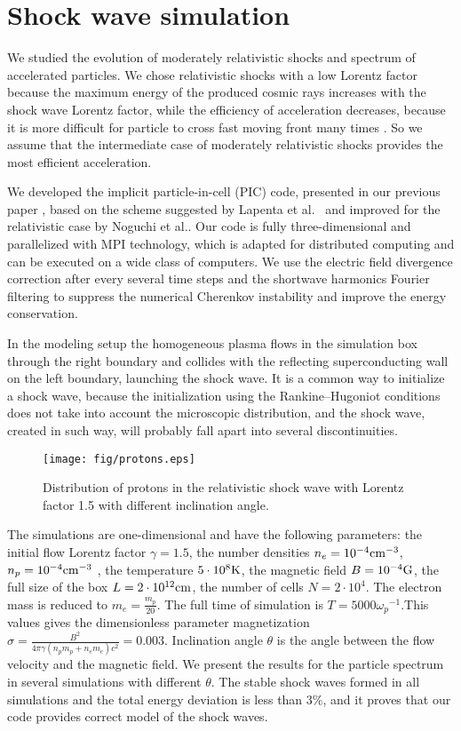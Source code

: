 \section{Shock wave simulation}
We studied the evolution of moderately relativistic shocks and spectrum of accelerated particles. We chose relativistic shocks with a low Lorentz factor because the maximum energy of the produced cosmic rays increases with the shock wave Lorentz factor, while the efficiency of acceleration decreases, 
because it is more difficult for particle to cross fast moving front many times 
%
\cite{Ellison2013}. So we assume that the intermediate case of moderately relativistic shocks provides the most efficient acceleration.

We developed the implicit particle-in-cell (PIC) code, presented in our previous paper \cite{Romansky2016}, based on the scheme suggested by Lapenta et al.~\cite{Lapenta2006} and improved for the relativistic case by Noguchi et al.\cite{Noguchi2007}.
Our code is fully three-dimensional and parallelized with MPI technology, which is adapted for distributed computing and can be executed on a wide class of computers. We use 
the electric field divergence correction
after every several time steps and 
the shortwave harmonics Fourier filtering
to suppress the numerical Cherenkov instability and improve the energy conservation.

In the modeling setup the homogeneous plasma flows in the simulation box through the right boundary
and collides with the reflecting superconducting wall on the left boundary, launching the shock wave. It is a common way to initialize a shock wave, because the initialization using the Rankine–Hugoniot conditions does not take into account the microscopic distribution, and the shock wave, created in such way, will probably fall apart into several discontinuities.

\begin{figure}[h!]
	\centering
	\texttt{[image: fig/protons.eps]} 
	\caption{Distribution of protons in the relativistic shock wave with Lorentz factor 1.5 with different inclination angle.}
	\label{protons}
\end{figure} 
  
The simulations are one-dimensional and have the following parameters: the initial flow Lorentz factor $\gamma = 1.5$, the number densities $n_e = 10^{-4} \rm{cm}^{-3}$, $n_p = 10^{-4} \rm{cm}^{-3}$ , the temperature $5\cdot10^8 \rm{K}$, the magnetic field $B = 10^{-4} \rm{G}$, the full size of the box $L = 2\cdot10^{12} \rm{cm}$, the number of cells $N=2\cdot10^4$. The electron mass is reduced to $m_e = \frac{m_p}{20}$. The full time of simulation is $T = 5000 {\omega_p}^{-1}$.This values gives the dimensionless parameter magnetization $\sigma = \frac{B^2}{4\pi\gamma (n_p m_p + n_e m_e) c^2} = 0.003$. Inclination angle $\theta$ is the angle between the flow velocity and the magnetic field. We present the results for the particle spectrum in several simulations with different $\theta$. The stable shock waves formed in all simulations and the total energy deviation is less than $3\%$, and it proves that our code provides correct model of the shock waves. 


